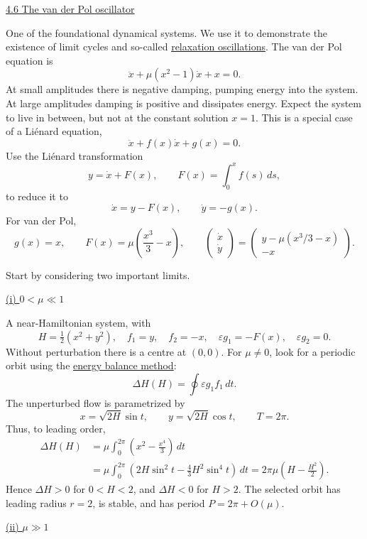 \documentclass[11pt,a4paper]{article}
\begin{document}
\bigskip
\noindent\underline{4.6 The van der Pol oscillator}

\medskip
\noindent One of the foundational dynamical systems. We use it to
demonstrate the existence of limit cycles and so-called
\underline{relaxation oscillations}.
The van der Pol equation is
\[
\boxed{\ddot x+\mu(x^2-1)\dot x+x=0}.
\]
At small amplitudes there is negative damping, pumping energy into the
system. At large amplitudes damping is positive and dissipates energy.
Expect the system to live in between, but not at the constant solution $x=1$.
This is a special case of a Li\'enard equation,
\[
\ddot x+f(x)\dot x+g(x)=0.
\]
Use the Li\'enard transformation
\[
y=\dot x+F(x),\qquad F(x)=\int_0^x f(s)\,ds,
\]
to reduce it to
\[
\dot x=y-F(x),\qquad \dot y=-g(x).
\]
For van der Pol,
\[
g(x)=x,\qquad F(x)=\mu\left(\frac{x^3}{3}-x\right),\qquad
\begin{pmatrix}\dot x\\\dot y\end{pmatrix}
=\begin{pmatrix}y-\mu(x^3/3-x)\\-x\end{pmatrix}.
\]

\newpage
\noindent Start by considering two important limits.

\medskip
\noindent\underline{(i) $0<\mu\ll1$}

\medskip
\noindent A near-Hamiltonian system, with
\[
H=\tfrac12(x^2+y^2),\quad f_1=y,\quad f_2=-x,\quad
\varepsilon g_1=-F(x),\quad\varepsilon g_2=0.
\]
Without perturbation there is a centre at $(0,0)$. For $\mu\ne0$, look
for a periodic orbit using the \underline{energy balance method}:
\[
\Delta H(H)=\oint\varepsilon g_1f_1\,dt.
\]
The unperturbed flow is parametrized by
\[
x=\sqrt{2H}\sin t,\qquad y=\sqrt{2H}\cos t,\qquad T=2\pi.
\]
Thus, to leading order,
\[
\begin{aligned}
\Delta H(H)
&=\mu\int_0^{2\pi}\left(x^2-\frac{x^4}{3}\right)\,dt\\
&=\mu\int_0^{2\pi}\left(2H\sin^2t-\frac43H^2\sin^4t\right)\,dt
=2\pi\mu\left(H-\frac{H^2}{2}\right).
\end{aligned}
\]
Hence $\Delta H>0$ for $0<H<2$, and $\Delta H<0$ for $H>2$.
The selected orbit has leading radius $r=2$, is stable, and has
period $P=2\pi+O(\mu)$.

\medskip
\noindent\underline{(ii) $\mu\gg1$}
\end{document}

